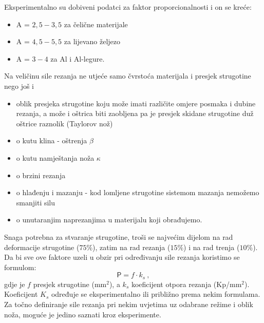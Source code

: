 \documentclass[a4paper,12pt]{article}
\numberwithin{figure}{section}
\begin{document}
Eksperimentalno su dobiveni podatci za faktor proporcionalnosti i on se kreće:
\begin{itemize}
\item A = $2,5 - 3,5$ za čelične materijale
\item A = $4,5 - 5,5$ za lijevano željezo
\item A = $3 - 4$ za Al i Al-legure.
\end{itemize} 
Na veličinu sile rezanja ne utjeće samo čvrstoća materijala i presjek strugotine nego još i
\begin{itemize}
\item oblik presjeka strugotine koju može imati različite omjere posmaka i dubine rezanja, a može i oštrica biti zaobljena pa je presjek skidane strugotine duž oštrice raznolik (Taylorov nož)
\item o kutu klina - oštrenja $\beta$
\item o kutu namještanja noža $\kappa$
\item o brzini rezanja
\item o hlađenju i mazanju - kod lomljene strugotine sistemom mazanja nemožemo smanjiti silu
\item o unutaranjim naprezanjima u materijalu koji obrađujemo.
\end{itemize} 
Snaga potrebna za stvaranje strugotine, troši se najvećim dijelom na rad deformacije strugotine ($75\%$), zatim na rad rezanja ($15\%$) i na rad trenja ($10\%$).
Da bi sve ove faktore uzeli u obzir pri određivanju sile rezanja koristimo se formulom:
\begin{equation}
\mathsf{P} = f \cdot k_{s}\:,
\end{equation}
gdje je $f$ presjek strugotine (mm$^{2}$), a $k_{s}$ koeficijent otpora rezanja (Kp/mm$^{2}$). Koeficijent $K_{s}$ određuje se eksperimentalno ili približno prema nekim formulama.
Za točno definiranje sile rezanja pri nekim uvjetima uz odabrane režime i oblik noža, moguće je jedino saznati kroz eksperimente.
\end{document}
